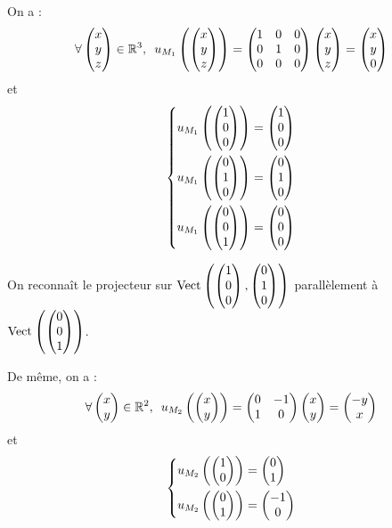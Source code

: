 \begin{corr}
On a : \[\quantifs{\forall\tcoords{x}{y}{z}\in\R^3}u_{M_1}\paren{\tcoords{x}{y}{z}}=\begin{pmatrix}
1 & 0 & 0 \\
0 & 1 & 0 \\
0 & 0 & 0
\end{pmatrix}\tcoords{x}{y}{z}=\tcoords{x}{y}{0}\] et \[\begin{dcases}
u_{M_1}\left(\begin{pmatrix}1\\0\\0\end{pmatrix}\right)=\begin{pmatrix}1\\0\\0\end{pmatrix} \\
u_{M_1}\left(\begin{pmatrix}0\\1\\0\end{pmatrix}\right)=\begin{pmatrix}0\\1\\0\end{pmatrix} \\
u_{M_1}\left(\begin{pmatrix}0\\0\\1\end{pmatrix}\right)=\begin{pmatrix}0\\0\\0\end{pmatrix}
\end{dcases}\]

On reconnaît le projecteur sur \(\Vect{\tcoords{1}{0}{0},\tcoords{0}{1}{0}}\) parallèlement à \(\Vect{\tcoords{0}{0}{1}}\).

De même, on a : \[\quantifs{\forall\dcoords{x}{y}\in\R^2}u_{M_2}\paren{\dcoords{x}{y}}=\begin{pmatrix}
0 & -1 \\
1 & 0
\end{pmatrix}\dcoords{x}{y}=\dcoords{-y}{x}\] et \[\begin{dcases}
u_{M_2}\left(\begin{pmatrix}1\\0\end{pmatrix}\right)=\begin{pmatrix}0\\1\end{pmatrix} \\
u_{M_2}\left(\begin{pmatrix}0\\1\end{pmatrix}\right)=\begin{pmatrix}-1\\0\end{pmatrix}
\end{dcases}\]
\end{corr}

